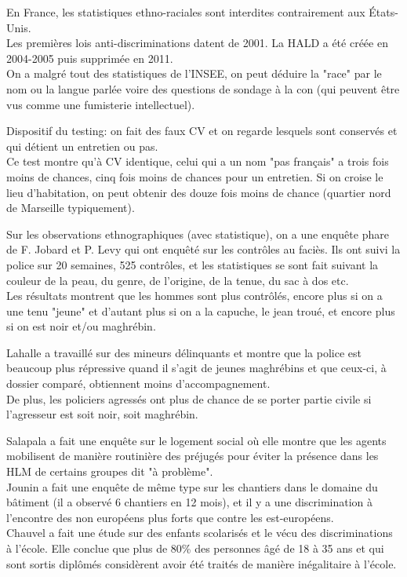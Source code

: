 \documentclass[10pt, a4paper, openany]{book}
\begin{document}
En France, les statistiques ethno-raciales sont interdites contrairement aux États-Unis. \\
Les premières lois anti-discriminations datent de 2001. La HALD a été créée en 2004-2005 puis supprimée en 2011. \\
On a malgré tout des statistiques de l'INSEE, on peut déduire la "race" par le nom ou la langue parlée voire des questions de sondage à la con (qui peuvent être vus comme une fumisterie intellectuel). 


Dispositif du testing: on fait des faux CV et on regarde lesquels sont conservés et qui détient un entretien ou pas. \\
Ce test montre qu'à CV identique, celui qui a un nom "pas français" a trois fois moins de chances, cinq fois moins de chances pour un entretien. Si on croise le lieu d'habitation, on peut obtenir des douze fois moins de chance (quartier nord de Marseille typiquement).


Sur les observations ethnographiques (avec statistique), on a une enquête phare de F. Jobard et P. Levy qui ont enquêté sur les contrôles au faciès. Ils ont suivi la police sur 20 semaines, 525 contrôles, et les statistiques se sont fait suivant la couleur de la peau, du genre, de l'origine, de la tenue, du sac à dos etc. \\
Les résultats montrent que les hommes sont plus contrôlés, encore plus si on a une tenu "jeune" et d'autant plus si on a la capuche, le jean troué, et encore plus si on est noir et/ou maghrébin. 


Lahalle a travaillé sur des mineurs délinquants et montre que la police est beaucoup plus répressive quand il s'agit de jeunes maghrébins et que ceux-ci, à dossier comparé, obtiennent moins d'accompagnement. \\
De plus, les policiers agressés ont plus de chance de se porter partie civile si l'agresseur est soit noir, soit maghrébin.


Salapala a fait une enquête sur le logement social où elle montre que les agents mobilisent de manière routinière des préjugés pour éviter la présence dans les HLM de certains groupes dit "à problème". \\
Jounin a fait une enquête de même type sur les chantiers dans le domaine du bâtiment (il a observé 6 chantiers en 12 mois), et il y a une discrimination à l'encontre des non européens plus forts que contre les est-européens. \\
Chauvel a fait une étude sur des enfants scolarisés et le vécu des discriminations à l'école. Elle conclue que plus de 80\% des personnes âgé de 18 à 35 ans et qui sont sortis diplômés considèrent avoir été traités de manière inégalitaire à l'école. 
\end{document}
